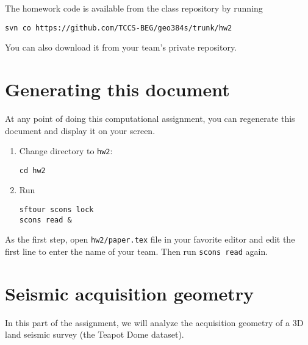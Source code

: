 The homework code is available from the class repository
by running
\begin{verbatim}
svn co https://github.com/TCCS-BEG/geo384s/trunk/hw2
\end{verbatim}
You can also download it from your team's private repository.

\section{Generating this document}

At any point of doing this computational assignment, you can
regenerate this document and display it on your screen.

\begin{enumerate}          
\item Change directory to \texttt{hw2}:
\begin{verbatim}
cd hw2
\end{verbatim}
\item Run
\begin{verbatim}
sftour scons lock
scons read &
\end{verbatim}
\end{enumerate}

As the first step, open \texttt{hw2/paper.tex} file in your favorite
editor and edit the first line to enter the name of your team. Then
run \texttt{scons read} again.

\section{Seismic acquisition geometry}

In this part of the assignment, we will analyze the acquisition
geometry of a 3D land seismic survey (the Teapot Dome dataset).

